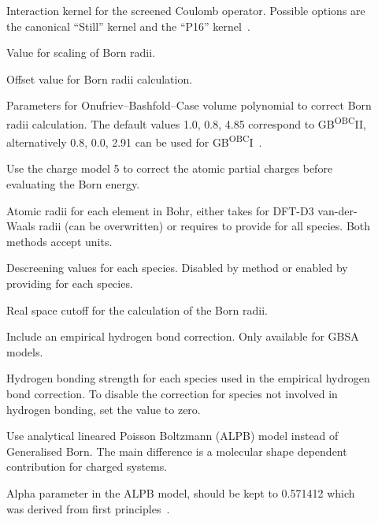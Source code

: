\begin{description}
  \item[]
    Interaction kernel for the screened Coulomb operator.
    Possible options are the canonical ``Still'' kernel\cite{still1990} and the
    ``P16'' kernel~\cite{lange2012}.

  \item[] Value for scaling of Born radii.

  \item[] 
    Offset value for Born radii calculation.

  \item[] Parameters for Onufriev--Bashfold--Case volume
    polynomial to correct Born radii calculation.
    The default values 1.0, 0.8, 4.85 correspond to GB\textsuperscript{OBC}II,
    alternatively 0.8, 0.0, 2.91 can be used for GB\textsuperscript{OBC}I~\cite{onufriev2004}.

  \item[] Use the charge model 5 to correct the atomic partial charges
    before evaluating the Born energy.

  \item[] Atomic radii for each element in Bohr, either takes
     for DFT-D3 van-der-Waals radii (can be overwritten)
    or requires to provide  for all species.
    Both methods accept  units.

  \item[] Descreening values for each species.
    Disabled by  method or enabled by providing 
    for each species.

  \item[] 
    Real space cutoff for the calculation of the Born radii.

  \item[]
    Include an empirical hydrogen bond correction.
    Only available for GBSA models.

  \item[]
    Hydrogen bonding strength for each species used in the empirical hydrogen
    bond correction. To disable the correction for species not involved
    in hydrogen bonding, set the value to zero.

  \item[]
    Use analytical lineared Poisson Boltzmann (ALPB) model\cite{sigalov2006}
    instead of Generalised Born.
    The main difference is a molecular shape dependent contribution for charged
    systems.

  \item[]
    Alpha parameter in the ALPB model, should be kept to 0.571412 which was
    derived from first principles~\cite{sigalov2006}.
\end{description}

